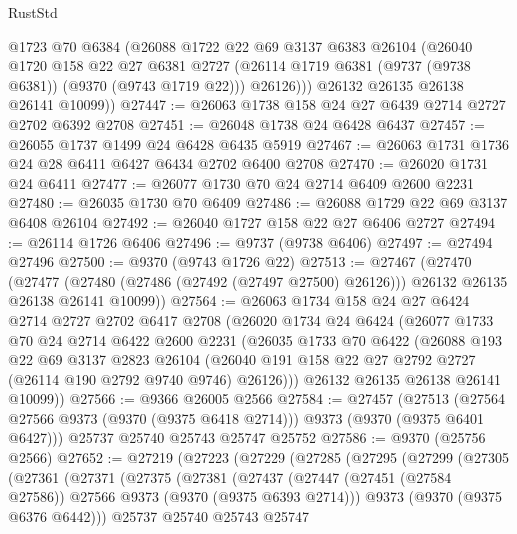 \begin{lexlean}{RustStd}
\begin{coremodule}
          @1723
          @70
          @6384
          (@26088
            @1722
            @22
            @69
            @3137
            @6383
            @26104
            (@26040
              @1720
              @158
              @22
              @27
              @6381
              @2727
              (@26114 @1719 @6381 (@9737 (@9738 @6381)) (@9370 (@9743 @1719 @22)))
              @26126)))
        @26132
        @26135
        @26138
        @26141
        @10099))
@27447 := @26063 @1738 @158 @24 @27 @6439 @2714 @2727 @2702 @6392 @2708
@27451 := @26048 @1738 @24 @6428 @6437
@27457 := @26055 @1737 @1499 @24 @6428 @6435 @5919
@27467 := @26063 @1731 @1736 @24 @28 @6411 @6427 @6434 @2702 @6400 @2708
@27470 := @26020 @1731 @24 @6411
@27477 := @26077 @1730 @70 @24 @2714 @6409 @2600 @2231
@27480 := @26035 @1730 @70 @6409
@27486 := @26088 @1729 @22 @69 @3137 @6408 @26104
@27492 := @26040 @1727 @158 @22 @27 @6406 @2727
@27494 := @26114 @1726 @6406
@27496 := @9737 (@9738 @6406)
@27497 := @27494 @27496
@27500 := @9370 (@9743 @1726 @22)
@27513 := @27467
    (@27470
      (@27477 (@27480 (@27486 (@27492 (@27497 @27500) @26126))) @26132 @26135 @26138 @26141 @10099))
@27564 := @26063
    @1734
    @158
    @24
    @27
    @6424
    @2714
    @2727
    @2702
    @6417
    @2708
    (@26020
      @1734
      @24
      @6424
      (@26077
        @1733
        @70
        @24
        @2714
        @6422
        @2600
        @2231
        (@26035
          @1733
          @70
          @6422
          (@26088
            @193
            @22
            @69
            @3137
            @2823
            @26104
            (@26040 @191 @158 @22 @27 @2792 @2727 (@26114 @190 @2792 @9740 @9746) @26126)))
        @26132
        @26135
        @26138
        @26141
        @10099))
@27566 := @9366 @26005 @2566
@27584 := @27457
    (@27513 (@27564 @27566 @9373 (@9370 (@9375 @6418 @2714))) @9373 (@9370 (@9375 @6401 @6427)))
    @25737
    @25740
    @25743
    @25747
    @25752
@27586 := @9370 (@25756 @2566)
@27652 := @27219
    (@27223
      (@27229
        (@27285
          (@27295
            (@27299
              (@27305
                (@27361
                  (@27371
                    (@27375
                      (@27381
                        (@27437
                          (@27447 (@27451 (@27584 @27586)) @27566 @9373 (@9370 (@9375 @6393 @2714)))
                          @9373
                          (@9370 (@9375 @6376 @6442)))
                        @25737
                        @25740
                        @25743
                        @25747

\end{coremodule}
\end{lexlean}
